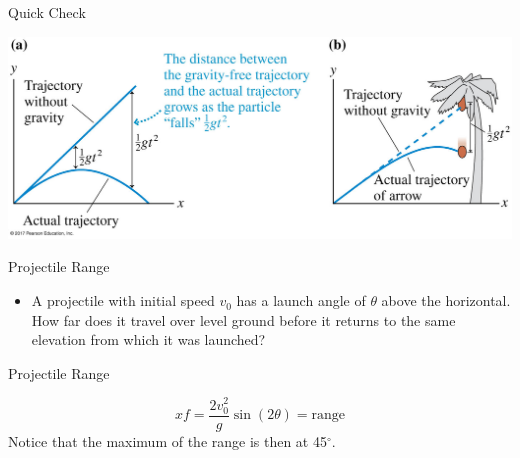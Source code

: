 \documentclass{beamer}
\begin{document}
\begin{frame}{Quick Check}
\begin{center}
   \includegraphics[width=\textwidth]{../figures/04_14_Figure.jpg}
\end{center}
\end{frame}

\begin{frame}{Projectile Range}
\begin{itemize}
   \item A projectile with initial speed $v_0$ has a launch angle of $\theta$ above the horizontal. How far does it travel over level ground before it returns to the same elevation from which it was launched?
   \begin{center}
   \end{center}
\end{itemize}
\end{frame}

\begin{frame}{Projectile Range}
\begin{center}
\begin{equation*}
   xf=\frac{2v_0^2}{g}\sin(2\theta) = \text{range}
\end{equation*}
Notice that the maximum of the range is then at 45$^\circ$.
\end{center}
\end{frame}
\end{document}
